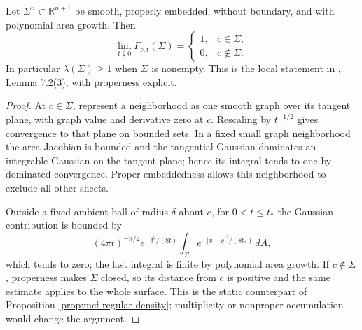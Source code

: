\begin{proposition}\label{prop:static-gaussian-density}
Let $\Sigma^n\subset\mathbb R^{n+1}$ be smooth, properly embedded, without boundary, and with polynomial area growth. Then
\[
 \lim_{t\downarrow0}F_{c,t}(\Sigma)=
 \begin{cases}1,&c\in\Sigma,\\0,&c\notin\Sigma.\end{cases}
\]
In particular $\lambda(\Sigma)\geq1$ when $\Sigma$ is nonempty. This is the local statement in \cite{CM12}, Lemma 7.2(3), with properness explicit.
\end{proposition}
\begin{proof}
At $c\in\Sigma$, represent a neighborhood as one smooth graph over its tangent plane, with graph value and derivative zero at $c$. Rescaling by $t^{-1/2}$ gives convergence to that plane on bounded sets. In a fixed small graph neighborhood the area Jacobian is bounded and the tangential Gaussian dominates an integrable Gaussian on the tangent plane; hence its integral tends to one by dominated convergence. Proper embeddedness allows this neighborhood to exclude all other sheets.

Outside a fixed ambient ball of radius $\delta$ about $c$, for $0<t\leq t_*$ the Gaussian contribution is bounded by
\[
 (4\pi t)^{-n/2}e^{-\delta^2/(8t)}
 \int_\Sigma e^{-|x-c|^2/(8t_*)}\,dA,
\]
which tends to zero; the last integral is finite by polynomial area growth. If $c\notin\Sigma$, properness makes $\Sigma$ closed, so its distance from $c$ is positive and the same estimate applies to the whole surface. This is the static counterpart of Proposition \ref{prop:mcf-regular-density}; multiplicity or nonproper accumulation would change the argument.
\end{proof}
